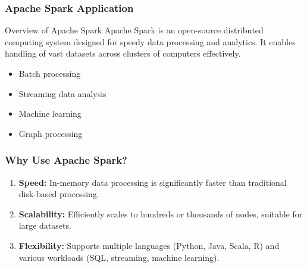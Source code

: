 \documentclass[aspectratio=169]{beamer}
\begin{document}
\begin{frame}[fragile]
    \frametitle{Apache Spark Application}
    \begin{block}{Overview of Apache Spark}
        Apache Spark is an open-source distributed computing system designed for speedy data processing and analytics. 
        It enables handling of vast datasets across clusters of computers effectively.
    \end{block}
    
    \begin{itemize}
        \item Batch processing
        \item Streaming data analysis
        \item Machine learning
        \item Graph processing
    \end{itemize}
\end{frame}

\begin{frame}[fragile]
    \frametitle{Why Use Apache Spark?}
    \begin{enumerate}
        \item \textbf{Speed:} In-memory data processing is significantly faster than traditional disk-based processing.
        \item \textbf{Scalability:} Efficiently scales to hundreds or thousands of nodes, suitable for large datasets.
        \item \textbf{Flexibility:} Supports multiple languages (Python, Java, Scala, R) and various workloads (SQL, streaming, machine learning).
    \end{enumerate}
\end{frame}
\end{document}
